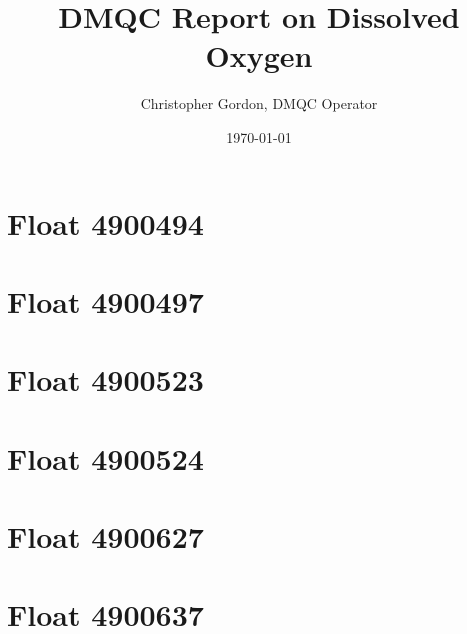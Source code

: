 

\title{DMQC Report on Dissolved Oxygen}
\author{Christopher Gordon, DMQC Operator}
\date{\today}


	\maketitle	\clearpage
	\section{Float 4900494}
	\section{Float 4900497}
	\section{Float 4900523}
	\section{Float 4900524}
	\section{Float 4900627}
	\section{Float 4900637}


